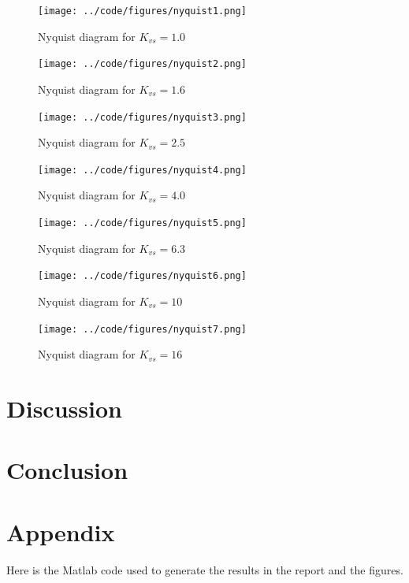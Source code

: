 \documentclass[a4paper, titlepage]{article}
\begin{document}
\begin{figure}[h!]
\center
\texttt{[image: ../code/figures/nyquist1.png]}
\caption{Nyquist diagram for $K_{vs}=1.0$}
\label{fig:nyquist1}
\end{figure}

\begin{figure}[h!]
\center
\texttt{[image: ../code/figures/nyquist2.png]}
\caption{Nyquist diagram for $K_{vs}=1.6$}
\label{fig:nyquist2}
\end{figure}

\begin{figure}[h!]
\center
\texttt{[image: ../code/figures/nyquist3.png]}
\caption{Nyquist diagram for $K_{vs}=2.5$}
\label{fig:nyquist3}
\end{figure}

\begin{figure}[h!]
\center
\texttt{[image: ../code/figures/nyquist4.png]}
\caption{Nyquist diagram for $K_{vs}=4.0$}
\label{fig:nyquist4}
\end{figure}

\begin{figure}[h!]
\center
\texttt{[image: ../code/figures/nyquist5.png]}
\caption{Nyquist diagram for $K_{vs}=6.3$}
\label{fig:nyquist5}
\end{figure}

\begin{figure}[h!]
\center
\texttt{[image: ../code/figures/nyquist6.png]}
\caption{Nyquist diagram for $K_{vs}=10$}
\label{fig:nyquist6}
\end{figure}

\begin{figure}[h!]
\center
\texttt{[image: ../code/figures/nyquist7.png]}
\caption{Nyquist diagram for $K_{vs}=16$}
\label{fig:nyquist7}
\end{figure}


\section{Discussion}
\section{Conclusion}




\clearpage


\clearpage
\appendix

\section{Appendix}
Here is the Matlab code used to generate the results in the report and the figures.


\end{document}
